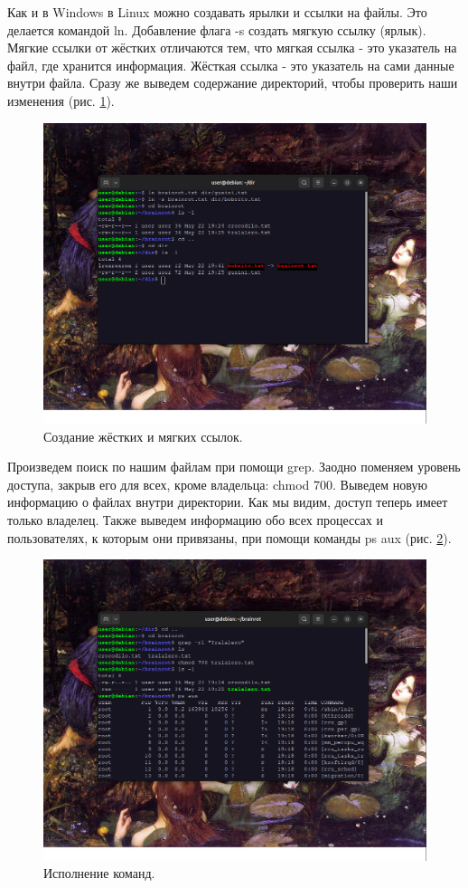   Как и в Windows в Linux можно создавать ярылки и ссылки на файлы. Это делается командой ln. Добавление флага -s создать мягкую ссылку (ярлык). Мягкие ссылки от жёстких отличаются тем, что мягкая ссылка - это указатель на файл, где хранится информация. Жёсткая ссылка - это указатель на сами данные внутри файла. Сразу же выведем содержание директорий, чтобы проверить наши изменения (рис. \ref{fig:ln}).

  \begin{figure}[h!]
      \centering
      \includegraphics[width=0.7\linewidth]{Pic/lab5/Снимок экрана от 2025-05-22 19-42-42.png}
      \caption{Создание жёстких и мягких ссылок.}
      \label{fig:ln}
  \end{figure}

  Произведем поиск по нашим файлам при помощи grep. Заодно поменяем уровень доступа, закрыв его для всех, кроме владельца: chmod 700. Выведем новую информацию о файлах внутри директории. Как мы видим, доступ теперь имеет только владелец. Также выведем информацию обо всех процессах и пользователях, к которым они привязаны, при помощи команды ps aux (рис. \ref{fig:psaux}). 

  \begin{figure}[h!]
      \centering
      \includegraphics[width=0.7\linewidth]{Pic/lab5/Снимок экрана от 2025-05-22 20-03-50.png}
      \caption{Исполнение команд.}
      \label{fig:psaux}
  \end{figure}

